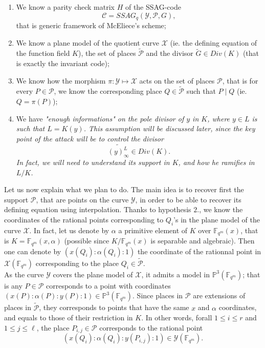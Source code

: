 \documentclass[10pt]{article}
\newcommand{\s}{\vspace{0.3cm}}
\newcommand{\fqm}{\mathbb{F}_{q^m}}
\newcommand{\X}{\mathcal{X}}
\newcommand{\Y}{\mathcal{Y}}
\newcommand{\PR}{\mathcal{P}}
\begin{document}
\begin{enumerate}
\item We know a parity check matrix $H$ of the SSAG-code  \[\mathcal{C} = SSAG_q(\Y,\PR,G),\]
that is generic framework of McEliece's scheme;
\item We know a plane model of the quotient curve $\X$ (ie. the defining equation of the function field $K$), the set of places $\tilde{\PR}$ and the divisor $\tilde{G} \in Div(K)$ (that is exactly the invariant code);
\item We know how the morphism $\pi : \Y \longmapsto \X$ acts on the set of places $\PR$, that is for every $P \in \PR$, we know the corresponding place $Q \in \tilde{\PR}$ such that $P \mid Q$ (ie. $Q=\pi(P)$);
\item We have \it{"enough informations"} \rm on the pole divisor of $y$ in $K$, where $y \in L$ is such that $L=K(y)$. This assumption will be discussed later, since the key point of the attack will be to control the divisor 
\[\widetilde{(y)^L_{\infty}} \in Div(K).\] 
In fact, we will need to understand its support in $K$, and how he ramifies in $L/K$.
\end{enumerate}
\s

Let us now explain what we plan to do. The main idea is to recover first the support $\PR$, that are points on the curve $\Y$, in order to be able to recover its defining equation using interpolation. Thanks to hypothesis $2.$, we know the coordinates of the rational points corresponding to $Q_i$'s in the plane model of the curve $\X$. In fact, let us denote by $\alpha$ a primitive element of $K$ over $\fqm(x)$, that is $K = \fqm(x,\alpha)$ (possible since $K/\fqm(x)$ is separable and algebraic). Then one can denote by $(x(Q_i):\alpha(Q_i):1)$ the coordinate of the rationnal point in $\X(\fqm)$ corresponding to the place $Q_i \in \tilde{\PR}$. \\

As the curve $\Y$ covers the plane model of $\X$, it admits a model in $\mathbb{P}^3(\fqm)$; that is any $P \in \PR$ corresponds to a point with coordinates $(x(P):\alpha(P):y(P):1) \in \mathbb{P}^3(\fqm)$. Since places in $\PR$ are extensions of places in $\tilde{\PR}$, they corresponds to points that have the same $x$ and $\alpha$ coordinates, and equals to those of their restriction in $K$. In other words, forall $1 \leq i \leq r$ and $1 \leq j \leq \ell$, the place $P_{i,j} \in \PR$ corresponds to the rational point
\[ (x(Q_i):\alpha(Q_i):y(P_{i,j}):1) \in \Y(\fqm).\]
\end{document}
